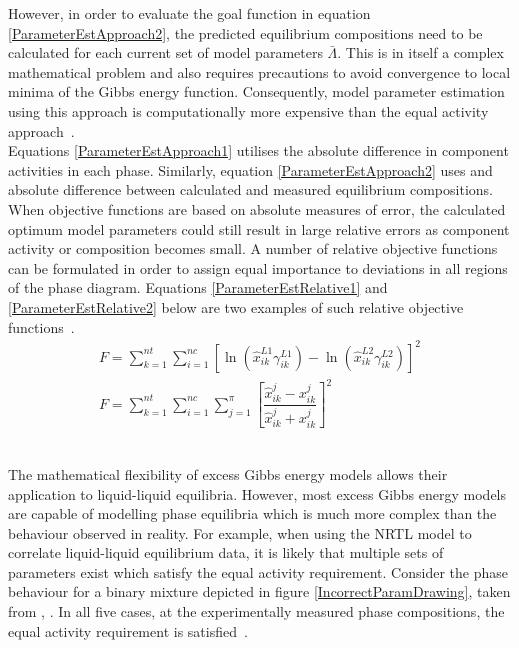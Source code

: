However, in order to evaluate the goal function in equation \ref{ParameterEstApproach2}, the predicted equilibrium compositions need to be calculated for each current set of model parameters $\bar{\Lambda}$. This is in itself a complex mathematical problem and also requires precautions to avoid convergence to local minima of the Gibbs energy function. Consequently, model parameter estimation using this approach is computationally more expensive than the equal activity approach~\cite{LLECorrelation}.\\

Equations \ref{ParameterEstApproach1} utilises the absolute difference in component activities in each phase. Similarly, equation \ref{ParameterEstApproach2} uses and absolute difference between calculated and measured equilibrium compositions. When objective functions are based on absolute measures of error, the calculated optimum model parameters could still result in large relative errors as component activity or composition becomes small. A number of relative objective functions can be formulated in order to assign equal importance to deviations in all regions of the phase diagram. Equations \ref{ParameterEstRelative1} and \ref{ParameterEstRelative2} below are two examples of such relative objective functions~\cite{LLECorrelation}.\\

\begin{eqnarray}
F = \sum_{k=1}^{nt}\sum_{i=1}^{nc} \left[\ln \left(\hat{x}_{ik}^{L1}\gamma_{ik}^{L1}\right) - \ln \left(\hat{x}_{ik}^{L2}\gamma_{ik}^{L2}\right) \right]^{2} \label{ParameterEstRelative1}\\
F = \sum_{k=1}^{nt}\sum_{i=1}^{nc}\sum_{j=1}^{\pi}  \left[\dfrac{\hat{x}_{ik}^{j}-x_{ik}^{j}}{\hat{x}_{ik}^{j}+x_{ik}^{j}}\right]^{2} \label{ParameterEstRelative2}
\end{eqnarray}\

The mathematical flexibility of excess Gibbs energy models allows their application to liquid-liquid equilibria. However, most excess Gibbs energy models are capable of modelling phase equilibria which is much more complex than the behaviour observed in reality. For example, when using the NRTL model to correlate liquid-liquid equilibrium data, it is likely that multiple sets of parameters exist which satisfy the equal activity requirement. Consider the phase behaviour for a binary mixture depicted in figure \ref{IncorrectParamDrawing}, taken from \citeauthor{BilevelOptimization2}, \citeyear{BilevelOptimization2}. In all five cases, at the experimentally measured phase compositions, the equal activity requirement is satisfied~\cite{BilevelOptimization, BilevelOptimization2, ReliableComputationBinaryParams}.\\



